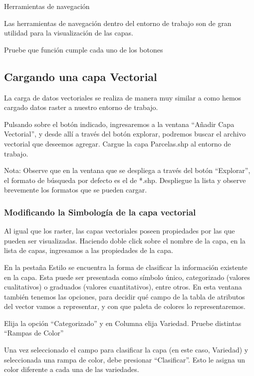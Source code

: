 \documentclass[]{article}
\begin{document}
Herramientas de navegación 

Las herramientas de navegación dentro del entorno de trabajo son de gran utilidad para la visualización de las capas. 

Pruebe que función cumple cada uno de los botones

\subsection{Cargando una capa Vectorial}

La carga de datos vectoriales se realiza de manera muy similar a como hemos cargado datos raster a nuestro entorno de trabajo.

Pulsando sobre el botón indicado, ingresaremos a la ventana “Añadir Capa Vectorial”, y desde allí a través del botón explorar, podremos buscar el archivo vectorial que deseemos agregar. 
Cargue la capa Parcelas.shp al entorno de trabajo. 

Nota: Observe que en la ventana que se despliega a través del botón “Explorar”, el formato de búsqueda por defecto es el de  *.shp. Despliegue la lista y observe brevemente los formatos que se pueden cargar. 

\subsubsection{Modificando la Simbología de la capa vectorial}

Al igual que los raster, las capas vectoriales poseen propiedades por las que pueden ser visualizadas. Haciendo doble click sobre el nombre de la capa, en la lista de capas, ingresamos a las propiedades de la capa. 

En la pestaña Estilo se encuentra la forma de clasificar la información existente en la capa. 
Esta puede ser presentada como símbolo único, categorizado (valores cualitativos) o graduados (valores cuantitativos), entre otros.
En esta ventana también tenemos las opciones, para decidir qué campo de la tabla de atributos del vector vamos a representar, y con que paleta de colores lo representaremos. 

Elija la opción “Categorizado” y en Columna elija Variedad. Pruebe distintas “Rampas de Color”

Una vez seleccionado el campo para clasificar la capa (en este caso, Variedad) y seleccionada una rampa de color, debe presionar “Clasificar”. Esto le asigna un color diferente a cada una de las variedades. 
\end{document}
